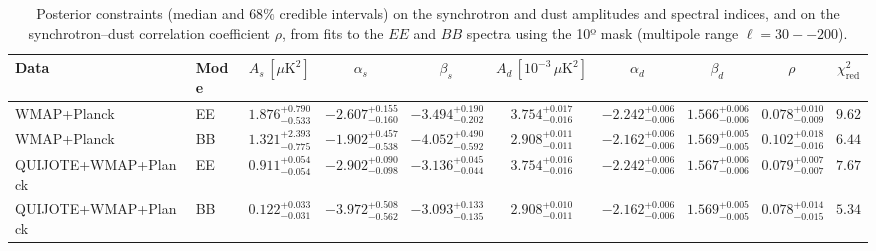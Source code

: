 \begin{table}[t]
\centering
\scriptsize
\setlength{\tabcolsep}{4pt}
\caption{Posterior constraints (median and $68\%$ credible intervals) on the synchrotron and dust amplitudes and spectral indices, and on the synchrotron--dust correlation coefficient $\rho$, from fits to the $EE$ and $BB$ spectra using the 10º mask (multipole range $\ell=30--200$).}
\label{tab:fit_results_c_terms}
\begin{tabular}{llcccccccc}
\toprule
Data & Mode & $A_s\,[\mu\mathrm{K}^2]$ & $\alpha_s$ & $\beta_s$ & $A_d\,[10^{-3}\,\mu\mathrm{K}^2]$ & $\alpha_d$ & $\beta_d$ & $\rho$ & $\chi^2_\mathrm{red}$ \\
\midrule
WMAP+Planck & EE & $1.876^{+0.790}_{-0.533}$ & $-2.607^{+0.155}_{-0.160}$ & $-3.494^{+0.190}_{-0.202}$ & $3.754^{+0.017}_{-0.016}$ & $-2.242^{+0.006}_{-0.006}$ & $1.566^{+0.006}_{-0.006}$ & $0.078^{+0.010}_{-0.009}$ & $9.62$ \\
WMAP+Planck & BB & $1.321^{+2.393}_{-0.775}$ & $-1.902^{+0.457}_{-0.538}$ & $-4.052^{+0.490}_{-0.592}$ & $2.908^{+0.011}_{-0.011}$ & $-2.162^{+0.006}_{-0.006}$ & $1.569^{+0.005}_{-0.005}$ & $0.102^{+0.018}_{-0.016}$ & $6.44$ \\
QUIJOTE+WMAP+Planck & EE & $0.911^{+0.054}_{-0.054}$ & $-2.902^{+0.090}_{-0.098}$ & $-3.136^{+0.045}_{-0.044}$ & $3.754^{+0.016}_{-0.016}$ & $-2.242^{+0.006}_{-0.006}$ & $1.567^{+0.006}_{-0.006}$ & $0.079^{+0.007}_{-0.007}$ & $7.67$ \\
QUIJOTE+WMAP+Planck & BB & $0.122^{+0.033}_{-0.031}$ & $-3.972^{+0.508}_{-0.562}$ & $-3.093^{+0.133}_{-0.135}$ & $2.908^{+0.010}_{-0.011}$ & $-2.162^{+0.006}_{-0.006}$ & $1.569^{+0.005}_{-0.005}$ & $0.078^{+0.014}_{-0.015}$ & $5.34$ \\
\bottomrule
\end{tabular}
\end{table}

